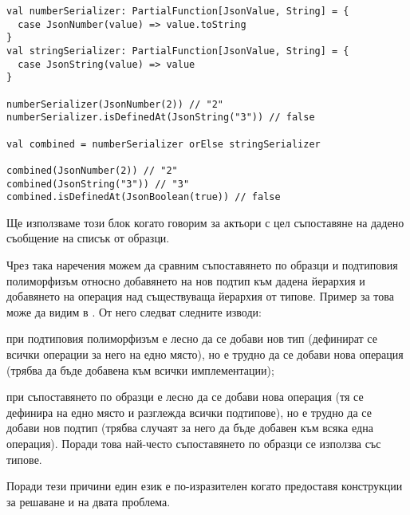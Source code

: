 \begin{lstlisting}
val numberSerializer: PartialFunction[JsonValue, String] = {
  case JsonNumber(value) => value.toString
}
val stringSerializer: PartialFunction[JsonValue, String] = {
  case JsonString(value) => value
}

numberSerializer(JsonNumber(2)) // "2"
numberSerializer.isDefinedAt(JsonString("3")) // false

val combined = numberSerializer orElse stringSerializer

combined(JsonNumber(2)) // "2"
combined(JsonString("3")) // "3"
combined.isDefinedAt(JsonBoolean(true)) // false
\end{lstlisting}

Ще използваме този блок когато говорим за актьори с цел съпоставяне на дадено съобщение на списък от образци.

Чрез така наречения  \cite{wadler1998TheExpressionProblem} можем да сравним съпоставянето по образци и подтиповия полиморфизъм относно добавянето на нов подтип към дадена йерархия и добавянето на операция над съществуваща йерархия от типове. Пример за това може да видим в . От него следват следните изводи:

\begin{itemize*}
  \item при подтиповия полиморфизъм е лесно да се добави нов тип (дефинират се всички операции за него на едно място), но е трудно да се добави нова операция (трябва да бъде добавена към всички имплементации);
  \item при съпоставянето по образци е лесно да се добави нова операция (тя се дефинира на едно място и разглежда всички подтипове), но е трудно да се добави нов подтип (трябва случаят за него да бъде добавен към всяка една операция). Поради това най-често съпоставянето по образци се използва със  типове.
\end{itemize*}

Поради тези причини един език е по-изразителен когато предоставя конструкции за решаване и на двата проблема.
